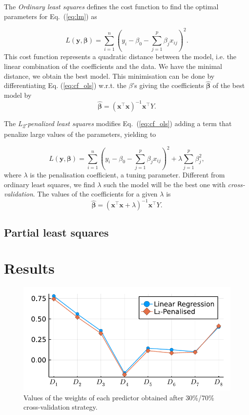 \documentclass[conference]{IEEEtran}
\begin{document}
The \emph{Ordinary least squares} defines the cost function to find the optimal parameters for Eq.~(\ref{eq:lm}) as

\begin{equation}\label{eq:cf_ols}
  L(\mathbf{y}, \boldsymbol{\beta}) =\sum_{i=1}^{n}\left(y_{i}-\beta_{0}-\sum_{j=1}^{p} \beta_{j} x_{i j}\right)^{2}.
\end{equation}
%
This cost function represents a quadratic distance between the model, i.e. the linear combination of the coefficients and the data. We have the minimal distance, we obtain the best model. This minimisation can be done by differentiating Eq. (\ref{eq:cf_ols}) w.r.t. the $\beta$'s giving the coefficients $\hat{\boldsymbol{\beta}}$ of the best model by
%
\[
\hat{\boldsymbol{\beta}} = (\mathbf{x}^\top\mathbf{x})^{-1}\mathbf{x}^\top Y.
\]

The \emph{L\textsubscript{2}-penalized least squares} modifies Eq.~(\ref{eq:cf_ols}) adding a term that penalize large values of the parameters, yielding to

\begin{equation}
  L(\mathbf{y}, \boldsymbol{\beta}) = \sum_{i=1}^{n}\left(y_{i}-\beta_{0}-\sum_{j=1}^{p} \beta_{j} x_{i j}\right)^{2}+\lambda \sum_{j=1}^{p} \beta_{j}^{2},
\end{equation}
%
where $\lambda$ is the penalisation coefficient, a tuning parameter. Different from ordinary least squares, we find $\lambda$ such the model will be the best one with \emph{cross-validation}. The values of the coefficients for a given $\lambda$ is 
%
\[
\hat{\boldsymbol{\beta}} = (\mathbf{x}^\top\mathbf{x} + \lambda)^{-1}\mathbf{x}^\top Y.
\]

\subsection{Partial least squares}

\section{Results} \label{sec:results}

\begin{figure}[htbp]
\centerline{\includegraphics[width=\columnwidth]{../figures/fitted_params_70}}
\caption{Values of the weights of each predictor obtained after 30\%/70\% cross-validation strategy.}
\end{figure}
\end{document}
